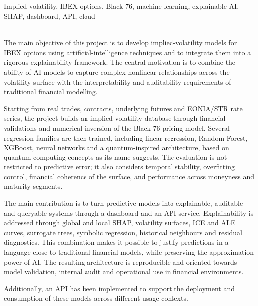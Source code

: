 \thispagestyle{empty}

\begin{center}
  {\large\bfseries \ProjectTitleEng}\\
\end{center}

\begin{center}
  \AuthorOne\\
  \AuthorTwo\\
  \vspace{0.7cm}
  \\
  Implied volatility, IBEX options, Black-76, machine learning,
  explainable AI, SHAP, dashboard, API, cloud\\
  \vspace{0.7cm}
  \\
\end{center}

The main objective of this project is to develop implied-volatility models for IBEX options using artificial-intelligence techniques and to integrate them into a rigorous explainability framework. The central motivation is to combine the ability of AI models to capture complex nonlinear relationships across the volatility surface with the interpretability and auditability requirements of traditional financial modelling.

Starting from real trades, contracts, underlying futures and EONIA/\texteuro{}STR rate series, the project builds an implied-volatility database through financial validations and numerical inversion of the Black-76 pricing model. Several regression families are then trained, including linear regression, Random Forest, XGBoost, neural networks and a quantum-inspired architecture, based on quantum computing concepts as its name suggests. The evaluation is not restricted to predictive error; it also considers temporal stability, overfitting control, financial coherence of the surface, and performance across moneyness and maturity segments.

The main contribution is to turn predictive models into explainable, auditable and queryable systems through a dashboard and an API service. Explainability is addressed through global and local SHAP, volatility surfaces, ICE and ALE curves, surrogate trees, symbolic regression, historical neighbours and residual diagnostics. This combination makes it possible to justify predictions in a language close to traditional financial models, while preserving the approximation power of AI. The resulting architecture is reproducible and oriented towards model validation, internal audit and operational use in financial environments.

Additionally, an API has been implemented to support the deployment and consumption of these models across different usage contexts.

\newpage
